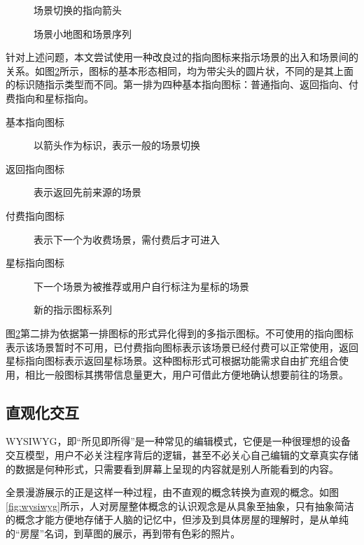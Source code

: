 \begin{figure}[htp]
\centering
\begin{minipage}{.45\textwidth}
\centering
{}
\caption{场景切换的指向箭头}
\label{fig:tip}
\end{minipage}
\begin{minipage}{.45\textwidth}
\centering 
{}
\caption{场景小地图和场景序列}
\label{fig:map}
\end{minipage}
\end{figure}

针对上述问题，本文尝试使用一种改良过的指向图标来指示场景的出入和场景间的关系。如图\ref{fig:point}所示，图标的基本形态相同，均为带尖头的圆片状，不同的是其上面的标识随指示类型而不同。第一排为四种基本指向图标：普通指向、返回指向、付费指向和星标指向。

\begin{description}
	\item [基本指向图标] 以箭头作为标识，表示一般的场景切换
	\item [返回指向图标] 表示返回先前来源的场景
	\item [付费指向图标] 表示下一个为收费场景，需付费后才可进入
	\item [星标指向图标] 下一个场景为被推荐或用户自行标注为星标的场景
\end{description}

\begin{figure}[htp]
\centering
{}
\caption{新的指示图标系列}
\label{fig:point}
\end{figure}

图\ref{fig:point}第二排为依据第一排图标的形式异化得到的多指示图标。不可使用的指向图标表示该场景暂时不可用，已付费指向图标表示该场景已经付费可以正常使用，返回星标指向图标表示返回星标场景。这种图标形式可根据功能需求自由扩充组合使用，相比一般图标其携带信息量更大，用户可借此方便地确认想要前往的场景。

\subsection{直观化交互}
WYSIWYG，即“所见即所得”是一种常见的编辑模式，它便是一种很理想的设备交互模型，用户不必关注程序背后的逻辑，甚至不必关心自己编辑的文章真实存储的数据是何种形式，只需要看到屏幕上呈现的内容就是别人所能看到的内容。

全景漫游展示的正是这样一种过程，由不直观的概念转换为直观的概念。如图\ref{fig:wysiwyg}所示，人对房屋整体概念的认识观念是从具象至抽象，只有抽象简洁的概念才能方便地存储于人脑的记忆中，但涉及到具体房屋的理解时，是从单纯的“房屋”名词，到草图的展示，再到带有色彩的照片。

